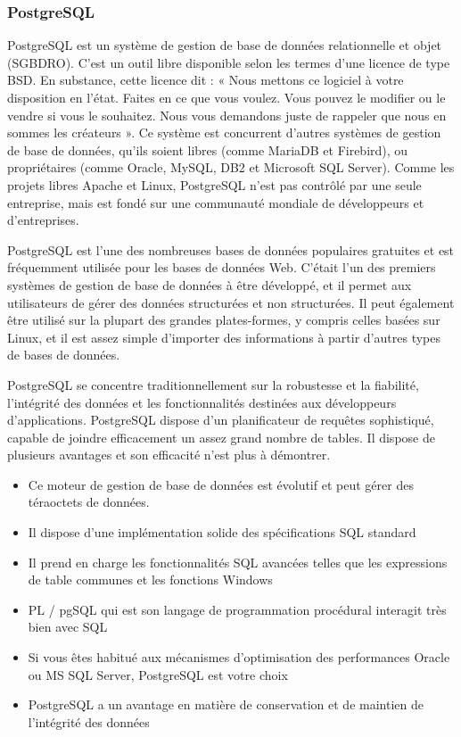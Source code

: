 	  \subsubsection{PostgreSQL}
	    PostgreSQL est un système de gestion de base de données relationnelle et objet (SGBDRO). C'est un outil libre disponible selon les termes d'une licence de type BSD. En substance, cette licence dit : « Nous mettons ce logiciel à votre disposition en l'état. Faites en ce que vous voulez. Vous pouvez le modifier ou le vendre si vous le souhaitez. Nous vous demandons juste de rappeler que nous en sommes les créateurs ».
	    Ce système est concurrent d'autres systèmes de gestion de base de données, qu'ils soient libres (comme MariaDB et Firebird), ou propriétaires (comme Oracle, MySQL, DB2 et Microsoft SQL Server). Comme les projets libres Apache et Linux, PostgreSQL n'est pas contrôlé par une seule entreprise, mais est fondé sur une communauté mondiale de développeurs et d'entreprises.
	    
	    PostgreSQL est l'une des nombreuses bases de données populaires gratuites et est fréquemment utilisée pour les bases de données Web. C'était l'un des premiers systèmes de gestion de base de données à être développé, et il permet aux utilisateurs de gérer des données structurées et non structurées. Il peut également être utilisé sur la plupart des grandes plates-formes, y compris celles basées sur Linux, et il est assez simple d'importer des informations à partir d'autres types de bases de données.

	    PostgreSQL se concentre traditionnellement sur la robustesse et la fiabilité, l'intégrité des données et les fonctionnalités destinées aux développeurs d'applications. PostgreSQL dispose d'un planificateur de requêtes sophistiqué, capable de joindre efficacement un assez grand nombre de tables. Il dispose de plusieurs avantages et son efficacit\'e n'est plus \`a d\'emontrer. 

	    \begin{itemize}
	      \item Ce moteur de gestion de base de données est évolutif et peut gérer des téraoctets de données.
	      \item Il dispose d'une implémentation solide des spécifications SQL standard
	      \item Il prend en charge les fonctionnalités SQL avancées telles que les expressions de table communes et les fonctions Windows
	      \item PL / pgSQL qui est son langage de programmation procédural interagit très bien avec SQL
	      \item Si vous êtes habitué aux mécanismes d'optimisation des performances Oracle ou MS SQL Server, PostgreSQL est votre choix
	      \item PostgreSQL a un avantage en matière de conservation et de maintien de l'intégrité des données
	    \end{itemize}
	    

